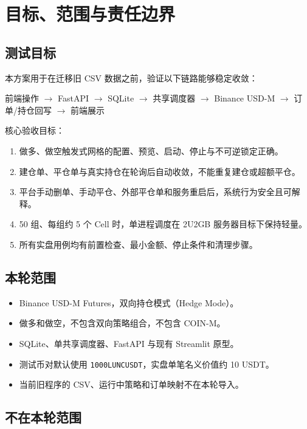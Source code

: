 \section{目标、范围与责任边界}

\subsection{测试目标}

本方案用于在迁移旧 CSV 数据之前，验证以下链路能够稳定收敛：

\begin{center}
前端操作 $\rightarrow$ FastAPI $\rightarrow$ SQLite $\rightarrow$ 共享调度器
$\rightarrow$ Binance USD-M $\rightarrow$ 订单/持仓回写 $\rightarrow$ 前端展示
\end{center}

核心验收目标：

\begin{enumerate}
  \item 做多、做空触发式网格的配置、预览、启动、停止与不可逆锁定正确。
  \item 建仓单、平仓单与真实持仓在轮询后自动收敛，不能重复建仓或超额平仓。
  \item 平台手动删单、手动平仓、外部平仓单和服务重启后，系统行为安全且可解释。
  \item 50 组、每组约 5 个 Cell 时，单进程调度在 2U2GB 服务器目标下保持轻量。
  \item 所有实盘用例均有前置检查、最小金额、停止条件和清理步骤。
\end{enumerate}

\subsection{本轮范围}

\begin{itemize}
  \item Binance USD-M Futures，双向持仓模式（Hedge Mode）。
  \item 做多和做空，不包含双向策略组合，不包含 COIN-M。
  \item SQLite、单共享调度器、FastAPI 与现有 Streamlit 原型。
  \item 测试币对默认使用 \texttt{1000LUNCUSDT}，实盘单笔名义价值约 10 USDT。
  \item 当前旧程序的 CSV、运行中策略和订单映射不在本轮导入。
\end{itemize}

\subsection{不在本轮范围}

